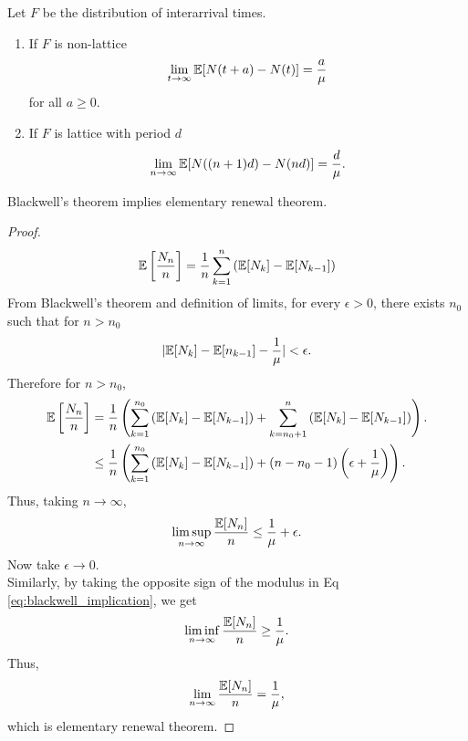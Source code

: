 \documentclass[all-lectures.tex]{subfiles}
\begin{document}
\begin{thm}
Let $F$ be the distribution of interarrival times. \\
\begin{enumerate} 
\item If $F$ is non-lattice
\begin{align*}
\lim_{t\to \infty}\mathbb{E}[N(t+a) - N(t)] = \frac{a}{\mu}
\end{align*}
for all $a \geq 0$.
\item If $F$ is lattice with period $d$
\begin{align*}
\lim_{n \to \infty}\mathbb{E}[N((n+1)d) - N(nd)] = \frac{d}{\mu}.
\end{align*}
\end{enumerate}
\begin{prop}
Blackwell's theorem implies elementary renewal theorem.
\end{prop}
\begin{proof}
\begin{align*}
\mathbb{E}\left[\frac{N_n}{n}\right] = \frac{1}{n}\sum_{k = 1}^{n} \left(\mathbb{E}[N_{k}] - \mathbb{E}[N_{k-1}]\right)
\end{align*}
From Blackwell's theorem and definition of limits, for every $\epsilon>0$, there exists $n_0$ such that for $n>n_0$
\begin{align}\label{eq:blackwell_implication}
\lvert\mathbb{E}[N_k] - \mathbb{E}[n_{k-1}] - \frac{1}{\mu}\rvert < \epsilon. 
\end{align}
Therefore for $n> n_0$, 
\begin{align*}
\mathbb{E}\left[\frac{N_n}{n}\right] &= \frac{1}{n}\left(\sum_{k=1}^{n_0} \left(\mathbb{E}[N_{k}] - \mathbb{E}[N_{k-1}]\right) + \sum_{k=n_0+1}^{n}\left(\mathbb{E}[N_{k}] - \mathbb{E}[N_{k-1}]\right) \right). \\
&\leq \frac{1}{n}\left(\sum_{k=1}^{n_0} \left(\mathbb{E}[N_{k}] - \mathbb{E}[N_{k-1}]\right) + (n-n_0-1) \left(\epsilon + \frac{1}{\mu}\right)\right).
\end{align*}
Thus, taking $n \to \infty$,
\begin{align*}
\limsup_{n\to \infty} \frac{\mathbb{E}[N_n]}{n} \leq \frac{1}{\mu} + \epsilon.  
\end{align*}
Now take $\epsilon \to 0$. \\
\indent Similarly, by taking the opposite sign of the modulus in Eq \ref{eq:blackwell_implication}, we get
\begin{align*}
\liminf_{n\to \infty} \frac{\mathbb{E}[N_n]}{n} \geq \frac{1}{\mu}.  
\end{align*}
Thus, 
\begin{align*}
\lim_{n\to \infty} \frac{\mathbb{E}[N_n]}{n} = \frac{1}{\mu},
\end{align*}
which is elementary renewal theorem.
\end{proof}
\end{thm}
\end{document}
